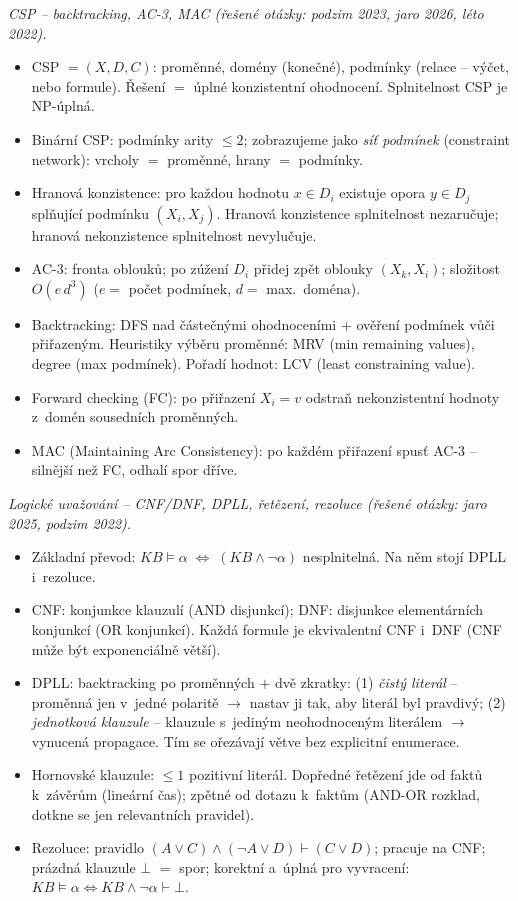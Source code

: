 \begin{poznamka}
\smallskip
\emph{CSP -- backtracking, AC-3, MAC (řešené otázky: podzim 2023, jaro 2026, léto 2022).}
\begin{itemize}
  \item CSP $= (X,D,C)$: proměnné, domény (konečné), podmínky (relace -- výčet, nebo formule). Řešení $=$ úplné konzistentní ohodnocení. Splnitelnost CSP je NP-úplná.
  \item Binární CSP: podmínky arity $\le 2$; zobrazujeme jako \emph{síť podmínek} (constraint network): vrcholy $=$ proměnné, hrany $=$ podmínky.
  \item Hranová konzistence: pro každou hodnotu $x\in D_i$ existuje opora $y\in D_j$ splňující podmínku $(X_i,X_j)$. Hranová konzistence splnitelnost nezaručuje; hranová nekonzistence splnitelnost nevylučuje.
  \item AC-3: fronta oblouků; po zúžení $D_i$ přidej zpět oblouky $(X_k,X_i)$; složitost $O(e\,d^3)$ ($e=$ počet podmínek, $d=$ max.\ doména).
  \item Backtracking: DFS nad částečnými ohodnoceními + ověření podmínek vůči přiřazeným. Heuristiky výběru proměnné: MRV (min remaining values), degree (max podmínek). Pořadí hodnot: LCV (least constraining value).
  \item Forward checking (FC): po přiřazení $X_i=v$ odstraň nekonzistentní hodnoty z~domén sousedních proměnných.
  \item MAC (Maintaining Arc Consistency): po každém přiřazení spusť AC-3 -- silnější než FC, odhalí spor dříve.
\end{itemize}

\smallskip
\emph{Logické uvažování -- CNF/DNF, DPLL, řetězení, rezoluce (řešené otázky: jaro 2025, podzim 2022).}
\begin{itemize}
  \item Základní převod: $KB\models\alpha \;\Leftrightarrow\; (KB\wedge\neg\alpha)$ nesplnitelná. Na něm stojí DPLL i~rezoluce.
  \item CNF: konjunkce klauzulí (AND disjunkcí); DNF: disjunkce elementárních konjunkcí (OR konjunkcí). Každá formule je ekvivalentní CNF i~DNF (CNF může být exponenciálně větší).
  \item DPLL: backtracking po proměnných $+$ dvě zkratky: (1) \emph{čistý literál} -- proměnná jen v~jedné polaritě $\to$ nastav ji tak, aby literál byl pravdivý; (2) \emph{jednotková klauzule} -- klauzule s~jediným neohodnoceným literálem $\to$ vynucená propagace. Tím se ořezávají větve bez explicitní enumerace.
  \item Hornovské klauzule: $\le 1$ pozitivní literál. Dopředné řetězení jde od faktů k~závěrům (lineární čas); zpětné od dotazu k~faktům (AND-OR rozklad, dotkne se jen relevantních pravidel).
  \item Rezoluce: pravidlo $(A\vee C)\wedge(\neg A\vee D)\vdash(C\vee D)$; pracuje na CNF; prázdná klauzule $\bot$ $=$ spor; korektní a~úplná pro vyvracení: $KB\models\alpha \Leftrightarrow KB\wedge\neg\alpha\vdash\bot$.
\end{itemize}


\end{poznamka}
